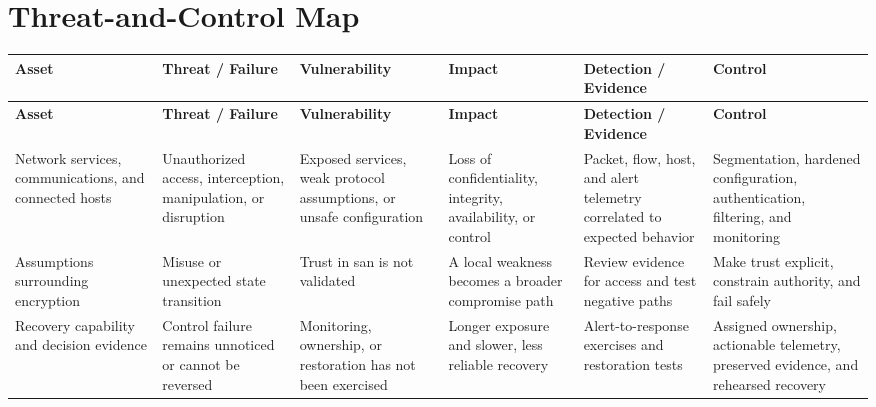 \documentclass[11pt,letterpaper]{article}
\begin{document}
\section*{Threat-and-Control Map}
\begingroup\scriptsize\setlength{\tabcolsep}{2pt}
\begin{longtable}{>{\raggedright\arraybackslash}p{}>{\raggedright\arraybackslash}p{}>{\raggedright\arraybackslash}p{}>{\raggedright\arraybackslash}p{}>{\raggedright\arraybackslash}p{}>{\raggedright\arraybackslash}p{}}
\toprule\rowcolor{Navy}\color{white}\textbf{Asset} & \color{white}\textbf{Threat / Failure} & \color{white}\textbf{Vulnerability} & \color{white}\textbf{Impact} & \color{white}\textbf{Detection / Evidence} & \color{white}\textbf{Control}\\\midrule
\endfirsthead
\toprule\rowcolor{Navy}\color{white}\textbf{Asset} & \color{white}\textbf{Threat / Failure} & \color{white}\textbf{Vulnerability} & \color{white}\textbf{Impact} & \color{white}\textbf{Detection / Evidence} & \color{white}\textbf{Control}\\\midrule
\endhead
Network services, communications, and connected hosts & Unauthorized access, interception, manipulation, or disruption & Exposed services, weak protocol assumptions, or unsafe configuration & Loss of confidentiality, integrity, availability, or control & Packet, flow, host, and alert telemetry correlated to expected behavior & Segmentation, hardened configuration, authentication, filtering, and monitoring\\\midrule
Assumptions surrounding encryption & Misuse or unexpected state transition & Trust in san is not validated & A local weakness becomes a broader compromise path & Review evidence for access and test negative paths & Make trust explicit, constrain authority, and fail safely\\\midrule
Recovery capability and decision evidence & Control failure remains unnoticed or cannot be reversed & Monitoring, ownership, or restoration has not been exercised & Longer exposure and slower, less reliable recovery & Alert-to-response exercises and restoration tests & Assigned ownership, actionable telemetry, preserved evidence, and rehearsed recovery\\\midrule
\bottomrule
\end{longtable}
\endgroup
\end{document}
